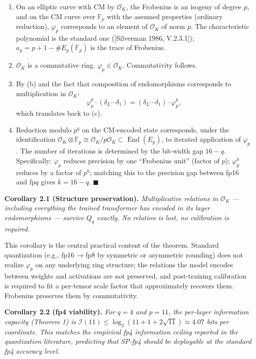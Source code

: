 \documentclass[
  11pt,
]{article}
\begin{document}
\begin{enumerate}
\def\labelenumi{(\alph{enumi})}
\item
  On an elliptic curve with CM by \(\mathcal{O}_K\), the Frobenius is an
  isogeny of degree \(p\), and on the CM curve over \(\mathbb{F}_p\)
  with the assumed properties (ordinary reduction), \(\varphi_p\)
  corresponds to an element of \(\mathcal{O}_K\) of norm \(p\). The
  characteristic polynomial is the standard one ({[}Silverman 1986,
  V.2.3.1{]}); \(a_p = p + 1 - \#E_p(\mathbb{F}_p)\) is the trace of
  Frobenius.
\item
  \(\mathcal{O}_K\) is a commutative ring.
  \(\varphi_p \in \mathcal{O}_K\). Commutativity follows.
\item
  By (b) and the fact that composition of endomorphisms corresponds to
  multiplication in \(\mathcal{O}_K\):
  \[\varphi_p^k \cdot (\delta_L \cdots \delta_1) = (\delta_L \cdots \delta_1) \cdot \varphi_p^k,\]
  which translates back to (c).
\item
  Reduction modulo \(p^q\) on the CM-encoded state corresponds, under
  the identification
  \(\mathcal{O}_K \otimes \mathbb{F}_p \cong \mathcal{O}_K / p\mathcal{O}_K \subset \operatorname{End}(E_p)\),
  to iterated application of \(\varphi_p\). The number of iterations is
  determined by the bit-width gap \(16 - q\). Specifically:
  \(\varphi_p\) reduces precision by one ``Frobenius unit'' (factor of
  \(p\)); \(\varphi_p^k\) reduces by a factor of \(p^k\); matching this
  to the precision gap between fp16 and fp\(q\) gives \(k = 16 - q\).
  \(\blacksquare\)
\end{enumerate}

\textbf{Corollary 2.1 (Structure preservation).} \emph{Multiplicative
relations in \(\mathcal{O}_K\) --- including everything the trained
transformer has encoded in its layer endomorphisms --- survive \(Q_q\)
exactly. No relation is lost, no calibration is required.}

This corollary is the central practical content of the theorem. Standard
quantization (e.g., fp16 → fp8 by symmetric or asymmetric rounding) does
not realize \(\varphi_p\) on any underlying ring structure; the
relations the model encodes between weights and activations are not
preserved, and post-training calibration is required to fit a per-tensor
scale factor that approximately recovers them. Frobenius preserves them
by commutativity.

\textbf{Corollary 2.2 (fp4 viability).} \emph{For \(q = 4\) and
\(p = 11\), the per-layer information capacity (Theorem 1) is
\(\mathcal{I}(11) \leq \log_2(11 + 1 + 2\sqrt{11}) \approx 4.07\) bits
per coordinate. This matches the empirical fp4 information ceiling
reported in the quantization literature, predicting that SP-fp4 should
be deployable at the standard fp4 accuracy level.}
\end{document}
